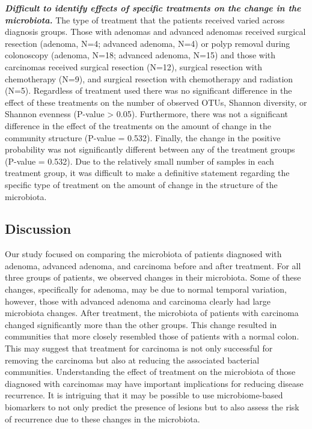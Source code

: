 \documentclass[12pt,]{article}
\begin{document}
\textbf{\emph{Difficult to identify effects of specific treatments on
the change in the microbiota.}} The type of treatment that the patients
received varied across diagnosis groups. Those with adenomas and
advanced adenomas received surgical resection (adenoma, N=4; advanced
adenoma, N=4) or polyp removal during colonoscopy (adenoma, N=18;
advanced adenoma, N=15) and those with carcinomas received surgical
resection (N=12), surgical resection with chemotherapy (N=9), and
surgical resection with chemotherapy and radiation (N=5). Regardless of
treatment used there was no significant difference in the effect of
these treatments on the number of observed OTUs, Shannon diversity, or
Shannon evenness (P-value \textgreater{} 0.05). Furthermore, there was
not a significant difference in the effect of the treatments on the
amount of change in the community structure (P-value = 0.532). Finally,
the change in the positive probability was not significantly different
between any of the treatment groups (P-value = 0.532). Due to the
relatively small number of samples in each treatment group, it was
difficult to make a definitive statement regarding the specific type of
treatment on the amount of change in the structure of the microbiota.

\newpage

\subsection{Discussion}\label{discussion}

Our study focused on comparing the microbiota of patients diagnosed with
adenoma, advanced adenoma, and carcinoma before and after treatment. For
all three groups of patients, we observed changes in their microbiota.
Some of these changes, specifically for adenoma, may be due to normal
temporal variation, however, those with advanced adenoma and carcinoma
clearly had large microbiota changes. After treatment, the microbiota of
patients with carcinoma changed significantly more than the other
groups. This change resulted in communities that more closely resembled
those of patients with a normal colon. This may suggest that treatment
for carcinoma is not only successful for removing the carcinoma but also
at reducing the associated bacterial communities. Understanding the
effect of treatment on the microbiota of those diagnosed with carcinomas
may have important implications for reducing disease recurrence. It is
intriguing that it may be possible to use microbiome-based biomarkers to
not only predict the presence of lesions but to also assess the risk of
recurrence due to these changes in the microbiota.
\end{document}

